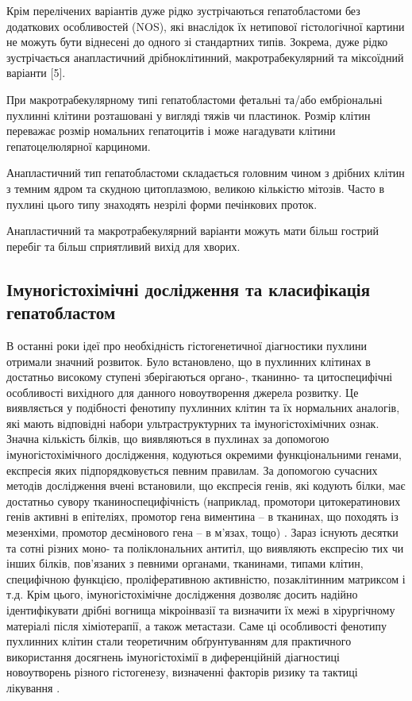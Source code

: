 Крім перелічених варіантів дуже рідко зустрічаються гепатобластоми без додаткових особливостей (NOS), які внаслідок їх нетипової гістологічної картини не можуть бути віднесені до одного зі стандартних типів. Зокрема, дуже рідко зустрічається анапластичний дрібноклітинний, макротрабекулярний та міксоїдний варіанти [5]. 

При макротрабекулярному типі гепатобластоми   фетальні та/або ембріональні пухлинні клітини розташовані у вигляді тяжів чи пластинок. Розмір клітин переважає розмір номальних гепатоцитів і може нагадувати клітини гепатоцелюлярної карциноми.

Анапластичний тип гепатобластоми складається головним чином з дрібних клітин з темним ядром та скудною цитоплазмою, великою кількістю мітозів. Часто в пухлині цього типу знаходять незрілі форми печінкових проток.

Анапластичний та макротрабекулярний варіанти можуть мати більш гострий перебіг та більш сприятливий вихід для хворих.

\subsection{Імуногістохімічні дослідження та класифікація гепатобластом}

В останні роки  ідеї про необхідність гістогенетичної діагностики пухлини отримали значний розвиток. Було встановлено, що в пухлинних клітинах в достатньо високому ступені зберігаються органо-,  тканинно- та цитоспецифічні особливості вихідного для данного новоутворення джерела розвитку. Це виявляється у подібності фенотипу пухлинних клітин та їх нормальних аналогів, які мають відповідні набори ультраструктурних та імуногістохімічних ознак. Значна кількість білків, що виявляються в пухлинах за допомогою імуногістохімічного дослідження, кодуються окремими функціональними генами, експресія яких підпорядковується певним правилам. За допомогою сучасних методів дослідження вчені встановили, що експресія генів, які кодують білки, має достатньо  сувору тканиноспецифічність (наприклад, промотори цитокератинових генів активні в епітеліях, промотор гена виментина – в тканинах, що походять із мезенхіми, промотор десмінового гена – в м’язах, тощо) \cite{pmid22648963}. 
Зараз існують десятки та сотні різних моно- та поліклональних антитіл, що виявляють експресію тих чи інших білків, пов’язаних з певними органами, тканинами, типами клітин, специфічною функцією, проліферативною активністю, позаклітинним матриксом і т.д. Крім цього, імуногістохімічне дослідження  дозволяє досить надійно ідентифікувати дрібні вогнища мікроінвазії та визначити їх межі в хірургічному матеріалі після хіміотерапії, а також  метастази. Саме ці особливості фенотипу пухлинних клітин стали теоретичним обґрунтуванням для практичного використання досягнень імуногістохімії в диференційній діагностиці новоутворень різного гістогенезу, визначенні факторів ризику та тактиці лікування \cite{pmid27781375}. 

